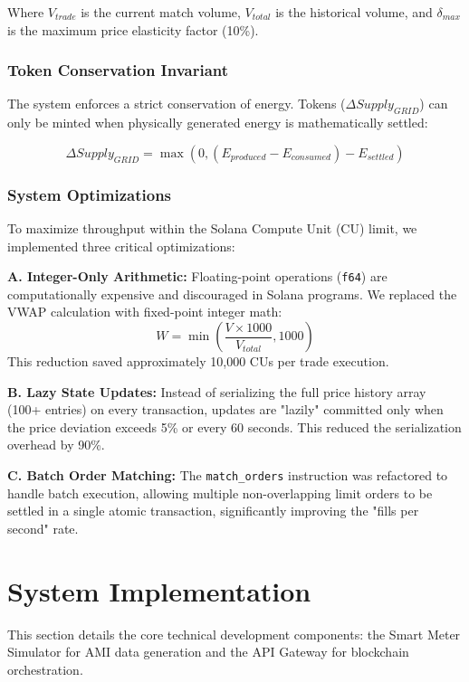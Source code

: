 \documentclass[conference]{IEEEtran}
\begin{document}
Where $V_{trade}$ is the current match volume, $V_{total}$ is the historical volume, and $\delta_{max}$ is the maximum price elasticity factor (10\%).

\subsubsection{Token Conservation Invariant}
The system enforces a strict conservation of energy. Tokens ($\Delta Supply_{GRID}$) can only be minted when physically generated energy is mathematically settled:

\begin{equation}
\Delta Supply_{GRID} = \max(0, (E_{produced} - E_{consumed}) - E_{settled})
\label{eq:token-conservation}
\end{equation}

\subsubsection{System Optimizations}
To maximize throughput within the Solana Compute Unit (CU) limit, we implemented three critical optimizations:

\textbf{A. Integer-Only Arithmetic:} 
Floating-point operations (\texttt{f64}) are computationally expensive and discouraged in Solana programs. We replaced the VWAP calculation with fixed-point integer math:
\begin{equation}
W = \min\left(\frac{V \times 1000}{V_{total}}, 1000\right)
\label{eq:weight-calc}
\end{equation}
This reduction saved approximately 10,000 CUs per trade execution.

\textbf{B. Lazy State Updates:}
Instead of serializing the full price history array (100+ entries) on every transaction, updates are "lazily" committed only when the price deviation exceeds 5\% or every 60 seconds. This reduced the serialization overhead by 90\%.

\textbf{C. Batch Order Matching:}
The \texttt{match\_orders} instruction was refactored to handle batch execution, allowing multiple non-overlapping limit orders to be settled in a single atomic transaction, significantly improving the "fills per second" rate.

\section{System Implementation}

This section details the core technical development components: the Smart Meter Simulator for AMI data generation and the API Gateway for blockchain orchestration.
\end{document}
